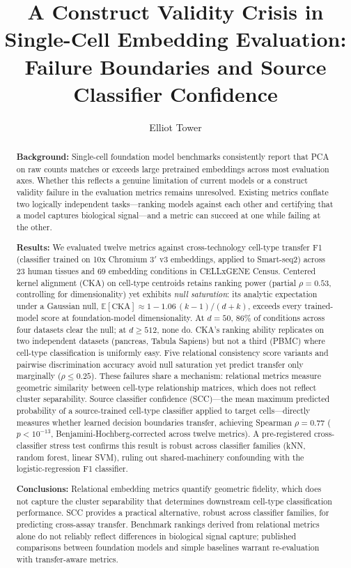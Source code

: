 \documentclass[11pt]{article}
\title{A Construct Validity Crisis in Single-Cell Embedding Evaluation:\\
Failure Boundaries and Source Classifier Confidence}
\author{Elliot Tower}
\affil{Independent Researcher \\ \texttt{elliot@elliottower.ai}}
\date{}
\begin{document}
\linenumbers
\maketitle

\begin{abstract}

\textbf{Background:}
Single-cell foundation model benchmarks consistently report that PCA
on raw counts matches or exceeds large pretrained embeddings across
most evaluation axes. Whether this reflects a genuine limitation of
current models or a construct validity failure in the evaluation
metrics remains unresolved. Existing metrics conflate two logically
independent tasks---ranking models against each other and certifying
that a model captures biological signal---and a metric can succeed at
one while failing at the other.

\textbf{Results:}
We evaluated twelve metrics against cross-technology cell-type
transfer F1 (classifier trained on 10x Chromium 3$'$ v3 embeddings,
applied to Smart-seq2) across 23 human tissues and 69 embedding
conditions in CELLxGENE Census. Centered kernel alignment (CKA) on
cell-type centroids retains ranking power (partial $\rho = 0.53$,
controlling for dimensionality) yet exhibits \emph{null saturation}:
its analytic expectation under a Gaussian null,
$\mathbb{E}[\mathrm{CKA}] \approx 1 - 1.06\,(k{-}1)/(d{+}k)$,
exceeds every trained-model score at foundation-model dimensionality.
At $d = 50$, 86\% of conditions across four datasets clear the null;
at $d \geq 512$, none do. CKA's ranking ability replicates on two
independent datasets (pancreas, Tabula Sapiens) but not a third
(PBMC) where cell-type classification is uniformly easy. Five
relational consistency score variants and pairwise discrimination
accuracy avoid null saturation yet predict transfer only marginally
($\rho \leq 0.25$). These failures share a mechanism: relational
metrics measure geometric similarity between cell-type relationship
matrices, which does not reflect cluster separability. Source
classifier confidence (SCC)---the mean maximum predicted probability
of a source-trained cell-type classifier applied to target
cells---directly measures whether learned decision boundaries
transfer, achieving Spearman $\rho = 0.77$ ($p < 10^{-13}$,
Benjamini-Hochberg-corrected across twelve metrics). A pre-registered
cross-classifier stress test confirms this result is robust across
classifier families (kNN, random forest, linear SVM), ruling out
shared-machinery confounding with the logistic-regression F1
classifier.

\textbf{Conclusions:}
Relational embedding metrics quantify geometric fidelity, which does
not capture the cluster separability that determines downstream
cell-type classification performance. SCC provides a practical
alternative, robust across classifier families, for predicting
cross-assay transfer. Benchmark rankings derived from relational
metrics alone do not reliably reflect differences in biological signal
capture; published comparisons between foundation models and simple
baselines warrant re-evaluation with transfer-aware metrics.

\end{abstract}
\end{document}
